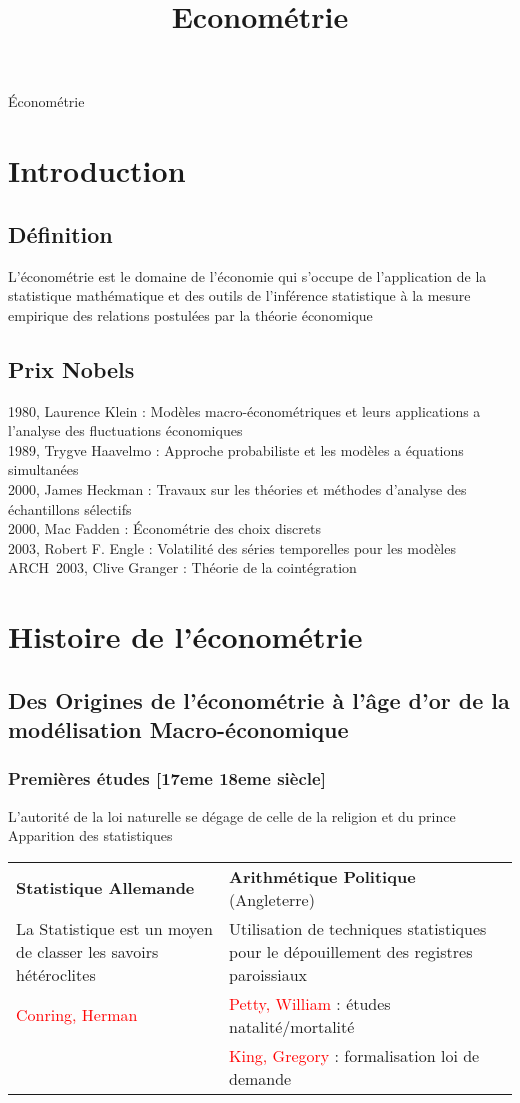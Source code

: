 \documentclass{article}
\title{Econométrie}
\begin{document}
{\Huge Économétrie}
\tableofcontents
\newpage
\section{Introduction}
\subsection{Définition}
L'économétrie est le domaine de l'économie qui s'occupe de l'application de la statistique mathématique et des outils de l'inférence statistique à la mesure empirique des relations postulées par la théorie économique
\subsection{Prix Nobels}
1980, Laurence Klein : Modèles macro-économétriques et leurs applications a l'analyse des fluctuations économiques\\
1989, Trygve Haavelmo : Approche probabiliste et les modèles a équations simultanées\\
2000, James Heckman : Travaux sur les théories et méthodes d'analyse des échantillons sélectifs\\
2000, Mac Fadden : Économétrie des choix discrets\\
2003, Robert F. Engle : Volatilité des séries temporelles pour les modèles ARCH\
2003, Clive Granger : Théorie de la cointégration
\section{Histoire de l'économétrie}
\subsection{Des Origines de l'économétrie à l'âge d'or de la modélisation Macro-économique}
\subsubsection{Premières études [17eme 18eme siècle]}
L'autorité de la loi naturelle se dégage de celle de la religion et du prince\\
Apparition des statistiques
\begin{center}
\begin{tabular}{m{200pt}|m{200pt}}
\textbf{Statistique Allemande} & \textbf{Arithmétique Politique} (Angleterre)\\
La Statistique est un moyen de classer les savoirs hétéroclites & Utilisation de techniques statistiques pour le dépouillement des registres paroissiaux \\
\textcolor{red}{Conring, Herman} & \textcolor{red}{Petty, William } : études natalité/mortalité\\
& \textcolor{red}{King, Gregory} : formalisation loi de demande
\end{tabular}
\end{center}
\end{document}
